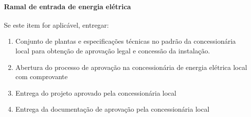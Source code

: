 \paragraph{Ramal de entrada de energia elétrica}
Se este item for aplicável, entregar:
\begin{enumerate}
	\item Conjunto de plantas e especificações técnicas no padrão da concessionária local para obtenção de aprovação legal e concessão da instalação.
	
	\item Abertura do processo de aprovação na concessionária de energia elétrica local com comprovante
	
	\item Entrega do projeto aprovado pela concessionária local
	
	\item Entrega da documentação de aprovação pela concessionária local
	
\end{enumerate}

